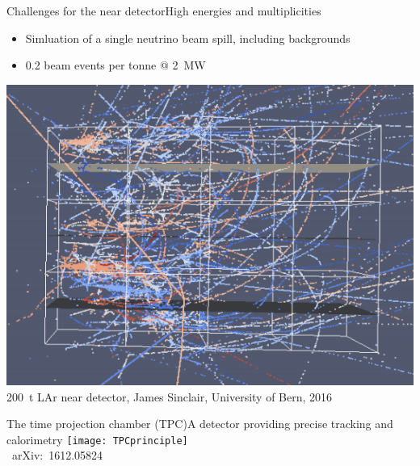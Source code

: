 \documentclass[]{beamer}
\newcommand*{\emphcol}{blue}
\begin{document}
\begin{frame}{Challenges for the near detector}{High energies and multiplicities}
	\begin{itemize}
		\item Simluation of a single neutrino beam spill, including backgrounds
		\item {\color{\emphcol} \num{0.2} beam events per tonne @ \SI{2}{\mega\watt}}
	\end{itemize}
	\centering
	\includegraphics[height=.6\textheight]{defence/dune_nd_pile-up}\\
	{\tiny \SI{200}{\tonne} LAr near detector, James Sinclair, University of Bern, 2016}\\
\end{frame}

\begin{frame}{The time projection chamber (TPC)}{A detector providing precise tracking and calorimetry}
	\centering
	\texttt{[image: TPCprinciple]}\\
	{\tiny \ub\ arXiv:~1612.05824~\cite{ub}}\\
\end{frame}
\end{document}
